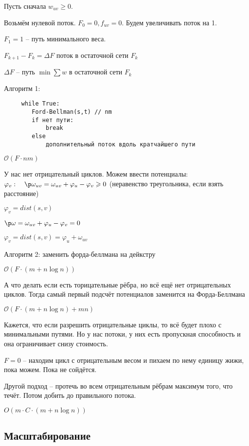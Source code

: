 Пусть сначала $w_{uv}\geqslant 0$.

Возьмём нулевой поток. $F_0 = 0, f_{uv} = 0$. Будем увеличивать поток на 1.

 $F_1 = 1$ -- путь минимального веса. 

 $F_{k+1}-F_k = \Delta F$  поток в остаточной сети $F_ k$ 

 $\Delta F$ -- путь  $\min \sum w$ в остаточной сети  $F_{k}$ 
 
 Алгоритм 1:
 \begin{lstlisting}
     while True:
        Ford-Bellman(s,t) // nm
        if нет пути:
            break
        else
            дополнительный поток вдоль кратчайшего пути
 \end{lstlisting}

 $\mathcal O\left( F \cdot nm \right) $

 У нас нет отрицательный циклов. Можем ввести потенциалы: $\varphi_v:\quad \p \omega_{uv} = \omega_{uv} + \varphi_u - \varphi_v \geqslant 0$ (неравенство треугольника, если взять расстояние)

 $\varphi_v = dist(s,v)$

 $\p \omega = \omega_{uv} +\varphi_u - \varphi_v = 0$

 $\varphi_v = dist(s,v) = \varphi_u + \omega_{uv}$

Алгоритм 2: заменить форда-беллмана на дейкстру

$\mathcal O\left( F \cdot  \left( m + n\log n \right)  \right) $ 

А что делать если есть торицательные рёбра, но всё ещё нет отрицательных циклов. Тогда самый первый подсчёт потенциалов заменится на Форда-Беллмана

$\mathcal O\left( F \cdot (m + n\log n) + mn \right) $ 

Кажется, что если разрешить отрицательные циклы, то всё будет плохо с минимальными путями. Но у нас потоки, у них есть пропускная способность и она ограничивает снизу стоимость.

$F = 0$ -- находим цикл с отрицательным весом и пихаем по нему единицу жижи, пока можем. Пока не сойдётся.

Другой подход -- протечь во всем отрицательным рёбрам максимум того, что течёт. Потом добить до правильного потока.

$O\left( m \cdot  C \cdot  (m + n\log n) \right) $ 

\subsection{Масштабирование}

